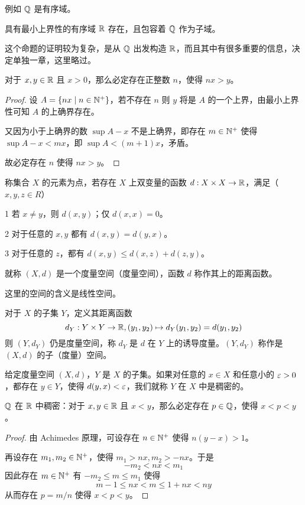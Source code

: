 例如 $\mathbb{Q}$ 是有序域。

\begin{theorem}[存在定理]
	具有最小上界性的有序域 $\mathbb{R}$ 存在，且包容着 $\mathbb{Q}$ 作为子域。
\end{theorem}

这个命题的证明较为复杂，是从 $\mathbb{Q}$ 出发构造 $\mathbb{R}$，而且其中有很多重要的信息，决定单独一章，这里略过。

\begin{theorem}[Achimedes 原理]
	对于 $x,y \in \mathbb{R}$ 且 $x>0$，那么必定存在正整数 $n$，使得 $nx>y$。
\end{theorem}
\begin{proof}
	设 $A = \{nx \mid n \in \mathbb{N}^+ \}$，若不存在 $n$ 则 $y$ 将是 $A$ 的一个上界，由最小上界性可知 $A$ 的上确界存在。
	
	又因为小于上确界的数 $\sup A-x$ 不是上确界，即存在 $m\in \mathbb{N}^+$ 使得 $\sup A -x <mx$，即 $\sup A < (m+1)x$，矛盾。

	故必定存在 $n$ 使得 $nx>y$。
\end{proof}

\begin{definition}[度量空间]
	称集合 $X$ 的元素为点，若存在 $X$ 上双变量的函数 $d:X \times X \to \mathbb{R}$，满足（$x,y,z\in R$）

	\num{1} 若 $x\ne y$，则 $d(x,y)$；仅 $d(x,x)=0$。

	\num{2} 对于任意的 $x,y$ 都有 $d(x,y) = d(y,x)$。

	\num{3} 对于任意的 $z$，都有 $d(x,y) \leqslant d(x,z) + d(z,y)$。

	就称 $(X,d)$ 是一个度量空间（度量空间），函数 $d$ 称作其上的距离函数。
\end{definition}

这里的空间的含义是线性空间。

对于 $X$ 的子集 $Y$，定义其距离函数
$$d_Y: Y \times Y \to \mathbb{R}, (y_1,y_2) \mapsto d_Y(y_1,y_2)=d(y_1,y_2)$$
则 $(Y,d_Y)$ 仍是度量空间，称 $d_Y$ 是 $d$ 在 $Y$ 上的诱导度量。$(Y,d_Y)$ 称作是 $(X,d)$ 的子（度量）空间。

\begin{definition}[稠密性]
	给定度量空间 $(X,d)$，$Y$ 是 $X$ 的子集。如果对任意的 $x\in X$ 和任意小的 $\varepsilon>0$，都存在 $y\in Y$，使得 $d(y,x)<\varepsilon$，我们就称 $Y$ 在 $X$ 中是稠密的。
\end{definition}

\begin{example}
	$\mathbb{Q}$ 在 $\mathbb{R}$ 中稠密：对于 $x,y \in \mathbb{R}$ 且 $x<y$，那么必定存在 $p\in\mathbb{Q}$，使得 $x<p<y$。
\end{example}
\begin{proof}
	由 Achimedes 原理，可设存在 $n\in \mathbb{N}^+$ 使得 $n(y-x)>1$。
	
	再设存在 $m_1,m_2\in \mathbb{N}^+$，使得 $m_1>nx,m_2>-nx$。于是
	$$-m_2<nx<m_1$$
	因此存在 $m\in \mathbb{N}^+$ 有 $-m_2\leqslant m \leqslant m_1$ 使得
	$$m-1\leqslant nx < m \leqslant 1+nx < ny$$
	从而存在 $p=m/n$ 使得 $x<p<y$。
\end{proof}


